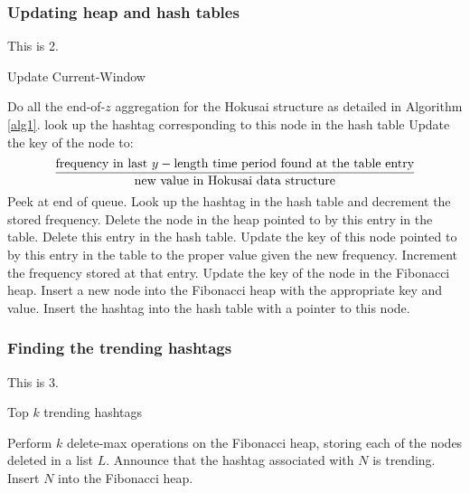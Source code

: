 \documentclass[twoside]{article}
\begin{document}
\subsubsection{Updating heap and hash tables}

This is 2.

\begin{algorithm}
\caption{Update Current-Window}\label{alg2}
\begin{algorithmic}[1]
		\State Do all the end-of-$z$ aggregation for the Hokusai structure as detailed in Algorithm \ref{alg1}.
			\State look up the hashtag corresponding to this node in the hash table
			\State Update the key of the node to: \[\frac{\textnormal{frequency in last } y-\textnormal{length time period found at the table entry}}{\textnormal{new value in Hokusai data structure}}\]
		\EndFor
	\EndIf
		\State Peek at end of queue.
			\State Look up the hashtag in the hash table and decrement the stored frequency.
				\State Delete the node in the heap pointed to by this entry in the table.
				\State Delete this entry in the hash table.
			\Else	
				\State Update the key of this node pointed to by this entry in the table to the proper value given the new frequency.
			\EndIf
		\EndIf
	\EndIf
		\State Increment the frequency stored at that entry.
		\State Update the key of the node in the Fibonacci heap.
	\Else
		\State Insert a new node into the Fibonacci heap with the appropriate key and value. 
		\State Insert the hashtag into the hash table with a pointer to this node.
 	\EndIf
\EndWhile
\end{algorithmic}
\end{algorithm}

\subsubsection{Finding the trending hashtags}

This is 3.

\begin{algorithm}
\caption{Top $k$ trending hashtags} \label{alg3}
\begin{algorithmic}[1]
\State Perform $k$ delete-max operations on the Fibonacci heap, storing each of the nodes deleted in a list $L$.
	\State Announce that the hashtag associated with $N$ is trending.
	\State Insert $N$ into the Fibonacci heap.
\EndFor
\end{algorithmic}
\end{algorithm}
\end{document}
